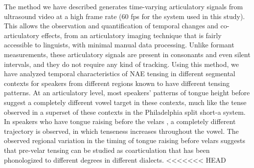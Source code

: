 \documentclass[output=paper]{LSP/langsci}
\begin{document}
The method we have described generates time-varying articulatory signals from ultrasound video at a high frame rate (60 fps for the system used in this study). This allows the observation and quantification of temporal changes and co-articulatory effects, from an articulatory imaging technique that is fairly accessible to linguists, with minimal manual data processing.  Unlike formant measurements, these articulatory signals are present in consonants and even silent intervals, and they do not require any kind of tracking.  Using this method, we have analyzed temporal characteristics of NAE \ips{\ae} tensing in different segmental contexts for speakers from different regions known to have different \ips{\ae} tensing patterns. At an articulatory level, most speakers' patterns of tongue height before  suggest a completely different vowel target in these contexts, much like the tense \ips{\ae} observed in a superset of these contexts in the Philadelphia split short-a system.  In speakers who have tongue raising before the velars , a completely different trajectory is observed, in which tenseness increases throughout the vowel.  The observed regional variation in the timing of tongue raising before velars suggests that pre-velar \ips{\ae} tensing can be studied as coarticulation that has been phonologized to different degrees in different dialects.
\printbibliography[heading=subbibliography,notkeyword=this]
<<<<<<< HEAD
\end{document}
